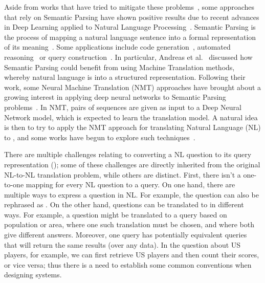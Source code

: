 Aside from works that have tried to mitigate these problems~\cite{semPar:lexical-gap-HakimovUWC15, 
semPar:complex-queries-GliozzoK12}, some approaches that rely on Semantic Parsing have shown positive 
results due to recent advances in Deep Learning applied to Natural Language 
Processing~\cite{semPar:sempar-as-mt-AndreasVC13}. Semantic Parsing is the process of mapping a 
natural language sentence into a formal representation of its 
meaning~\cite{semPar:sempar-as-mt-AndreasVC13}. Some applications include code 
generation~\cite{semPar:code-gen-RabinovichSK17, semPar:tranx-code-gen-YinN18}, automated 
reasoning~\cite{semPar:ITPKaliszykUV17} or query construction~\cite{semPar:txt-to-sql-RadevKZZFRS18}. 
In particular, Andreas et al.~\cite{semPar:sempar-as-mt-AndreasVC13} discussed how Semantic Parsing 
could benefit from using Machine Translation methods, whereby natural language is  
into a structured representation. Following their work, some Neural Machine Translation (NMT) approaches 
have brought about a growing interest in applying deep neural networks to Semantic Parsing 
problems~\cite{nmt:CaiXZYLL18, nmt:DongL16, nmt:ZhongCoRR17}. In NMT, pairs of sequences are given as 
input to a Deep Neural Network model, which is expected to learn the translation model. A natural idea 
is then to try to apply the NMT approach for translating Natural Language (NL) to \SPARQL{}, and some 
works have begun to explore such techniques~\cite{nmt:CoRRLuz18, nmt:nspm-SoruMMPVEN17, nmt:CoRRSoru18}.

There are multiple challenges relating to converting a NL question to its \SPARQL{} query 
representation (\NLtoSPARQL); some of these challenges are directly inherited from the 
original NL-to-NL translation problem, while others are distinct. First, there isn’t a one-to-one 
mapping for every NL question to a \SPARQL{} query. On one hand, there are multiple ways to 
express a question in NL. For example, the question  
can also be rephrased as . On the other 
hand, questions can be translated to \SPARQL{} in different ways. For example, a question  might be translated to a query based on population or area, 
where one such translation must be chosen, and where both give different answers. Moreover, 
one \SPARQL{} query has potentially equivalent queries that will return the same results (over any 
data). In the question about US players, for example, we can first retrieve US players and then 
count their scores, or vice versa; thus there is a need to establish some common conventions 
when designing \NLtoSPARQL{} systems. 

